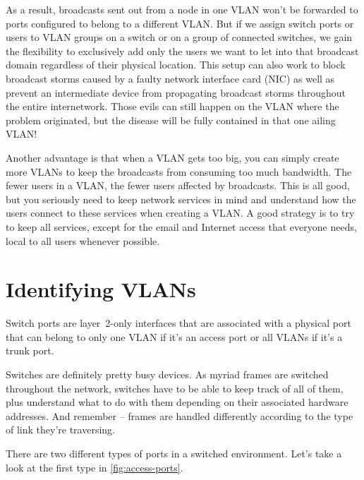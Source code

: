 \documentclass[b5paper,11pt]{memoir}
\begin{document}
As a result, broadcasts sent out from a node in one VLAN won't be
forwarded to ports configured to belong to a different VLAN. But if we
assign switch ports or users to VLAN groups on a switch or on a group of
connected switches, we gain the flexibility to exclusively add only the
users we want to let into that broadcast domain regardless of their
physical location. This setup can also work to block broadcast storms
caused by a faulty network interface card (NIC) as well as prevent an
intermediate device from propagating broadcast storms throughout the
entire internetwork. Those evils can still happen on the VLAN where the
problem originated, but the disease will be fully contained in that one
ailing VLAN!

Another advantage is that when a VLAN gets too big, you can simply create more VLANs to keep
the broadcasts from consuming too much bandwidth. The fewer users in a
VLAN, the fewer users affected by broadcasts. This is all good, but you
seriously need to keep network services in mind and understand how the
users connect to these services when creating a VLAN. A good strategy is
to try to keep all services, except for the email and Internet access
that everyone needs, local to all users whenever possible.

\section{Identifying VLANs}

Switch ports are layer~2-only interfaces that are associated with a physical port that can belong to only one VLAN if it's an access port or all VLANs if it's a trunk port.

Switches are definitely pretty busy devices.
As myriad frames are switched throughout the network, switches have to be able to keep track of all of them, plus understand what to do with them depending on their associated hardware addresses.
And remember -- frames are handled differently according to the type of link they're traversing.

There are two different types of ports in a switched environment.
Let's take a look at the first type in \cref{fig:access-ports}.
\end{document}
